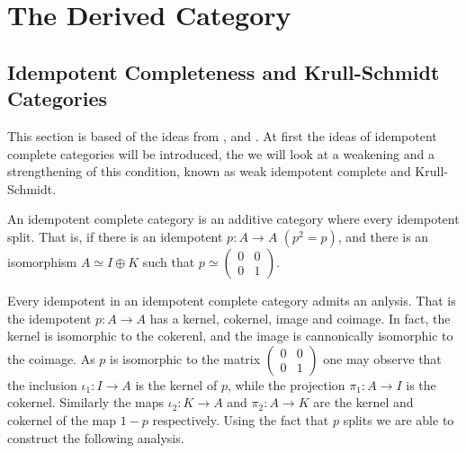 \chapter{The Derived Category}

\section{Idempotent Completeness and Krull-Schmidt Categories}

    This section is based of the ideas from \cite{buhler}, \cite{Kra12} and \cite{Rei95}.  At first the ideas of idempotent complete categories will be introduced, the we will look at a weakening and a strengthening of this condition, known as weak idempotent complete and Krull-Schmidt.

    \begin{definition}
        An idempotent complete category is an additive category where every idempotent split. That is, if there is an idempotent $p:A\rightarrow A$ $(p^2=p)$, and there is an isomorphism $A\simeq I\oplus K$ such that $p\simeq \begin{pmatrix} 0 & 0 \\ 0 & 1 \end{pmatrix}$. 
    \end{definition}

    Every idempotent in an idempotent complete category admits an  anlysis. That is the idempotent $p:A\rightarrow A$ has a kernel, cokernel, image and coimage. In fact, the kernel is isomorphic to the cokerenl, and the image is cannonically isomorphic to the coimage. As $p$ is isomorphic to the matrix $\begin{pmatrix} 0 & 0 \\ 0 & 1 \end{pmatrix}$ one may observe that the inclusion $\iota_1:I\rightarrow A$ is the kernel of $p$, while the projection $\pi_1:A\rightarrow I$ is the cokernel. Similarly the maps $\iota_2:K\rightarrow A$ and $\pi_2:A\rightarrow K$ are the kernel and cokernel of the map $1-p$ respectively. Using the fact that $p$ splits we are able to construct the following analysis.

    \begin{center}
    \end{center}


